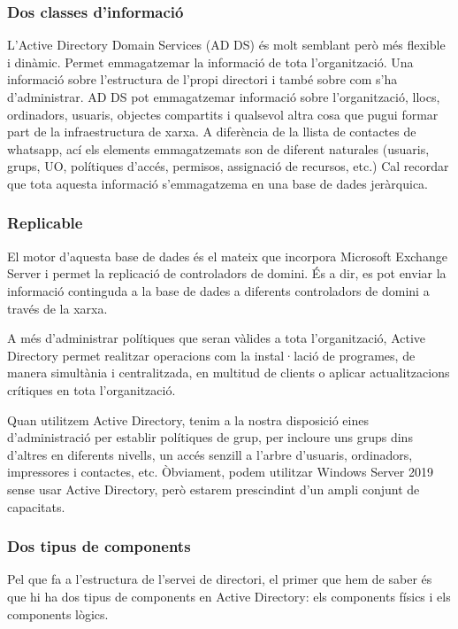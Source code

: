 \documentclass[
  a4paper,
]{article}
\begin{document}
\subsubsection{Dos classes
d'informació}\label{dos-classes-dinformaciuxf3}

L'Active Directory Domain Services (AD DS) és molt semblant però més
flexible i dinàmic. Permet emmagatzemar la informació de tota
l'organització. Una informació sobre l'estructura de l'propi directori i
també sobre com s'ha d'administrar. AD DS pot emmagatzemar informació
sobre l'organització, llocs, ordinadors, usuaris, objectes compartits i
qualsevol altra cosa que pugui formar part de la infraestructura de
xarxa. A diferència de la llista de contactes de whatsapp, ací els
elements emmagatzemats son de diferent naturales (usuaris, grups, UO,
polítiques d'accés, permisos, assignació de recursos, etc.) Cal recordar
que tota aquesta informació s'emmagatzema en una base de dades
jeràrquica.

\subsubsection{Replicable}\label{replicable}

El motor d'aquesta base de dades és el mateix que incorpora Microsoft
Exchange Server i permet la replicació de controladors de domini. És a
dir, es pot enviar la informació continguda a la base de dades a
diferents controladors de domini a través de la xarxa.

A més d'administrar polítiques que seran vàlides a tota l'organització,
Active Directory permet realitzar operacions com la instal·lació de
programes, de manera simultània i centralitzada, en multitud de clients
o aplicar actualitzacions crítiques en tota l'organització.

Quan utilitzem Active Directory, tenim a la nostra disposició eines
d'administració per establir polítiques de grup, per incloure uns grups
dins d'altres en diferents nivells, un accés senzill a l'arbre
d'usuaris, ordinadors, impressores i contactes, etc. Òbviament, podem
utilitzar Windows Server 2019 sense usar Active Directory, però estarem
prescindint d'un ampli conjunt de capacitats.

\subsubsection{Dos tipus de components}\label{dos-tipus-de-components}

Pel que fa a l'estructura de l'servei de directori, el primer que hem de
saber és que hi ha dos tipus de components en Active Directory: els
components físics i els components lògics.
\end{document}
